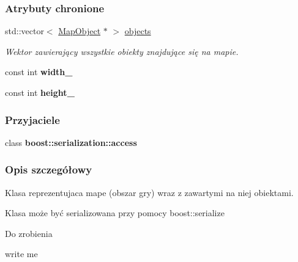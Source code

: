\subsubsection*{Atrybuty chronione}
\begin{DoxyCompactItemize}
\item 
std\-::vector$<$ \hyperlink{classMapObject}{Map\-Object} $\ast$ $>$ \hyperlink{classMap_a77f2877faf3096da591f2e2d17d92a25}{objects}
\begin{DoxyCompactList}\small\item\em Wektor zawierający wszystkie obiekty znajdujące się na mapie. \end{DoxyCompactList}\item 
\hypertarget{classMap_a53b23c1478b2810098bddf1ba519e98f}{const int {\bfseries width\-\_\-}}\label{classMap_a53b23c1478b2810098bddf1ba519e98f}

\item 
\hypertarget{classMap_a0153ef0948d92b1761bf5ff8449e8337}{const int {\bfseries height\-\_\-}}\label{classMap_a0153ef0948d92b1761bf5ff8449e8337}

\end{DoxyCompactItemize}
\subsubsection*{Przyjaciele}
\begin{DoxyCompactItemize}
\item 
\hypertarget{classMap_ac98d07dd8f7b70e16ccb9a01abf56b9c}{class {\bfseries boost\-::serialization\-::access}}\label{classMap_ac98d07dd8f7b70e16ccb9a01abf56b9c}

\end{DoxyCompactItemize}


\subsubsection{Opis szczegółowy}
Klasa reprezentujaca mape (obszar gry) wraz z zawartymi na niej obiektami. 

Klasa może być serializowana przy pomocy boost\-::serialize

\begin{DoxyRefDesc}{Do zrobienia}
\item[\hyperlink{todo__todo000006}{Do zrobienia}]write me \end{DoxyRefDesc}


